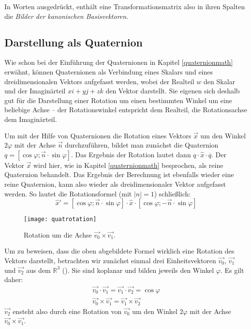 In Worten ausgedrückt, enthält eine Transformationsmatrix also in ihren Spalten die \emph{Bilder der kanonischen Basisvektoren}.

\subsection{Darstellung als Quaternion}
Wie schon bei der Einführung der Quaternionen in Kapitel \ref{quaternionmath} erwähnt, können Quaternionen als Verbindung eines Skalars und eines dreidimensionalen Vektors aufgefasst werden, wobei der Realteil $w$ den Skalar und der Imaginärteil $xi + yj + zk$ den Vektor  darstellt. Sie eigenen sich deshalb gut für die Darstellung einer Rotation um einen bestimmten Winkel um eine beliebige Achse -- der Rotationswinkel entspricht dem Realteil, die Rotationsachse dem Imaginärteil.

Um mit der Hilfe von Quaternionen die Rotation eines Vektors $\vec x$ um den Winkel $2 \varphi$ mit der Achse $\vec n$ durchzuführen, bildet man zunächst die Quaternion $q = \left[ \cos \varphi; \vec n \cdot \sin \varphi \right]$. Das Ergebnis der Rotation lautet dann $q \cdot \hat{x} \cdot \overline{q}$. Der Vektor $\vec x$ wird hier, wie in Kapitel \ref{quaternionmath} besprochen, als reine Quaternion behandelt. Das Ergebnis der Berechnung ist ebenfalls wieder eine reine Quaternion, kann also wieder als dreidimensionaler Vektor aufgefasst werden. So lautet die Rotationsformel (mit $\left| n \right| = 1$) schließlich:
\begin{equation}
 \hat{x}' = \left[ \cos \varphi; \vec n \cdot \sin \varphi \right] \cdot \hat{x} \cdot \left[ \cos \varphi; -\vec n \cdot \sin \varphi \right]
\end{equation}

\begin{wrapfigure}{r}{0.5\textwidth}
  \vspace{-10pt}
  \texttt{[image: quatrotation]}
  \vspace{-10pt}
  \caption{Rotation um die Achse $\vec{v_0} \times \vec{v_1}$.}
\end{wrapfigure}

Um zu beweisen, dass die oben abgebildete Formel wirklich eine Rotation des Vektors darstellt, betrachten wir zunächst einmal drei Einheitsvektoren $\vec{v_0}$, $\vec{v_1}$ und $\vec{v_2}$ aus dem $\mathbb R^3$ (\vgl \citep{quaternionproof}). Sie sind koplanar und bilden jeweils den Winkel $\varphi$. Es gilt daher:
\begin{align}
 \vec{v_0} \cdot \vec{v_1} = \vec{v_1} \cdot \vec{v_2} = \cos \varphi \label{dotsame} \\
 \vec{v_0} \times\vec{v_1} = \vec{v_1} \times \vec{v_2} \label{crosssame}
\end{align}
$\vec{v_2}$ ensteht also durch eine Rotation von $\vec{v_0}$ um den Winkel $2 \varphi$ mit der Achse $\vec{v_0} \times \vec{v_1}$.

